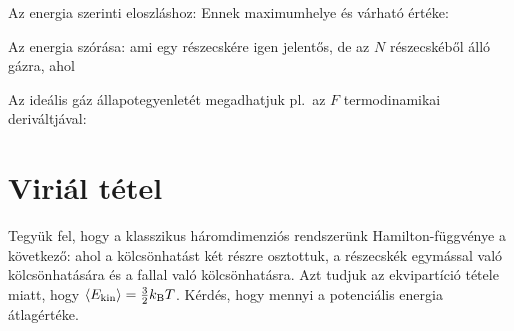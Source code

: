    Az energia szerinti eloszláshoz:
   Ennek maximumhelye és várható értéke:
   
   Az energia szórása:
   ami egy részecskére igen jelentős, de az $N$ részecskéből álló gázra, ahol
   
   Az ideális gáz állapotegyenletét megadhatjuk pl.\ az $F$ termodinamikai deriváltjával:
   
 \section{Viriál tétel}
  
  Tegyük fel, hogy a klasszikus háromdimenziós rendszerünk Hamilton-függvénye a következő:
  ahol a kölcsönhatást két részre osztottuk, a részecskék egymással való kölcsönhatására és a fallal való kölcsönhatásra. Azt tudjuk az ekvipartíció tétele miatt, hogy $\left\langle E_\text{kin}\right\rangle=\frac{3}{2}k_\text{B} T$. Kérdés, hogy mennyi a potenciális energia átlagértéke. 
  

